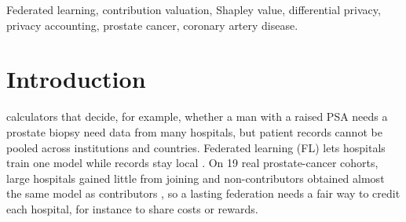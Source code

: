 \documentclass[journal]{IEEEtran}
\begin{document}
\begin{IEEEkeywords}
Federated learning, contribution valuation, Shapley value, differential privacy, privacy accounting, prostate cancer, coronary artery disease.
\end{IEEEkeywords}

\section{Introduction}
 calculators that decide, for example, whether a man with a raised PSA needs a prostate biopsy need data from many hospitals, but patient records cannot be pooled across institutions and countries. Federated learning (FL) lets hospitals train one model while records stay local \cite{Rieke2020DigitalHealth, McMahan2017FedAvg}. On 19 real prostate-cancer cohorts, large hospitals gained little from joining and non-contributors obtained almost the same model as contributors \cite{Kazlouski2025HospitalParticipation}, so a lasting federation needs a fair way to credit each hospital, for instance to share costs or rewards.
\end{document}
